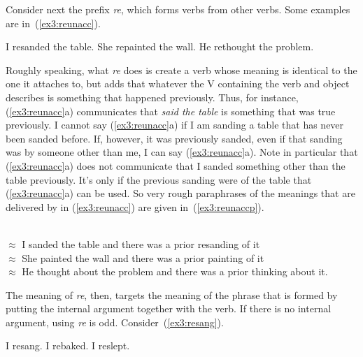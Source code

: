 Consider next the prefix \textit{re}, which forms verbs from other verbs. Some examples are in~(\ref{ex3:reunacc}).
\begin{exe}
\raggedright
	\ex \label{ex3:reunacc}
	\begin{xlist}
		\ex I resanded the table.
		\ex She repainted the wall.
		\ex He rethought the problem.
	\end{xlist}
\end{exe}
Roughly speaking, what \textit{re} does is create a verb whose meaning is identical to the one it attaches to, but adds that whatever the V containing the verb and object describes is something that happened previously. Thus, for instance, (\ref{ex3:reunacc}a) communicates that \textit{said the table} is something that was true previously. I cannot say (\ref{ex3:reunacc}a) if I am sanding a table that has never been sanded before. If, however, it was previously sanded, even if that sanding was by someone other than me, I can say (\ref{ex3:reunacc}a). Note in particular that (\ref{ex3:reunacc}a) does not communicate that I sanded something other than the table previously. It's only if the previous sanding were of the table that (\ref{ex3:reunacc}a) can be used. So very rough paraphrases of the meanings that are delivered by in (\ref{ex3:reunacc}) are given in~(\ref{ex3:reunaccp}).
\begin{exe}
\raggedright
	\ex \label{ex3:reunaccp}
	\begin{xlist}
		\ex {}\\ $\approx$ I sanded the table and there was a prior resanding of it
		\ex {}\\ $\approx$ She painted the wall and there was a prior painting of it
		\ex {}\\ $\approx$ He thought about the problem and there was a prior thinking about it.
	\end{xlist}
\end{exe}
The meaning of \textit{re}, then, targets the meaning of the phrase that is formed by putting the internal argument together with the verb. If there is no internal argument, using \textit{re} is odd. Consider~(\ref{ex3:resang}).
\begin{exe}
\raggedright
	\ex \label{ex3:resang}
	\begin{xlist}
		\ex I resang.
		\ex I rebaked.
		\ex I reslept.
	\end{xlist}
\end{exe}
